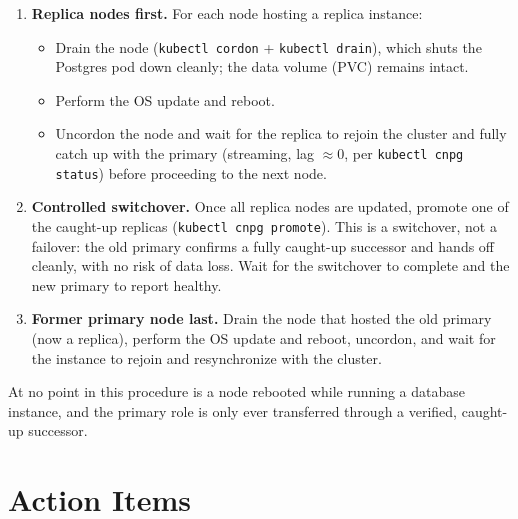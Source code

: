 \documentclass[PMO,authoryear,toc]{lsstdoc}
\begin{document}
\begin{enumerate}
  \item \textbf{Replica nodes first.} For each node hosting a replica
        instance:
        \begin{itemize}
          \item Drain the node (\texttt{kubectl cordon} +
                \texttt{kubectl drain}), which shuts the Postgres pod down
                cleanly; the data volume (PVC) remains intact.
          \item Perform the OS update and reboot.
          \item Uncordon the node and wait for the replica to rejoin the
                cluster and fully catch up with the primary (streaming, lag
                $\approx 0$, per \texttt{kubectl cnpg status}) before
                proceeding to the next node.
        \end{itemize}
  \item \textbf{Controlled switchover.} Once all replica nodes are updated,
        promote one of the caught-up replicas (\texttt{kubectl cnpg promote}).
        This is a switchover, not a failover: the old primary confirms a fully
        caught-up successor and hands off cleanly, with no risk of data loss.
        Wait for the switchover to complete and the new primary to report
        healthy.
  \item \textbf{Former primary node last.} Drain the node that hosted the old
        primary (now a replica), perform the OS update and reboot, uncordon,
        and wait for the instance to rejoin and resynchronize with the
        cluster.
\end{enumerate}

At no point in this procedure is a node rebooted while running a database
instance, and the primary role is only ever transferred through a verified,
caught-up successor.

\section{Action Items}
\end{document}
